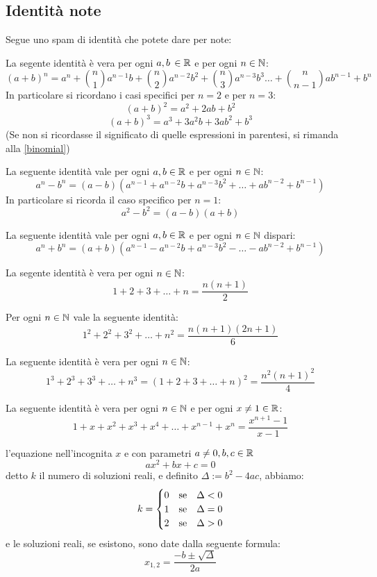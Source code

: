 \documentclass[11pt]{scrartcl}
\begin{document}
	
	\subsection{Identità note}
	Segue uno spam di identità che potete dare per note:
	
	\begin{theorem}
		\label{ident:newton}
		La segente identità è vera per ogni $a,b\,\in\mathbb R$ e per ogni $n\in\mathbb N$:
		$$(a+b)^n=a^n+\binom{n}{1}a^{n-1}b+\binom{n}{2}a^{n-2}b^2+\binom{n}{3}a^{n-3}b^3\dots+\binom{n}{n-1}ab^{n-1}+b^n$$
		In particolare si ricordano i casi specifici per $n=2$ e per $n=3$:
		$$(a+b)^2=a^2+2ab+b^2$$
		$$(a+b)^3=a^3+3a^2b+3ab^2+b^3$$
		(Se non si ricordasse il significato di quelle espressioni in parentesi, si rimanda alla \cref{binomial})
	\end{theorem}
	\begin{theorem}
		La seguente identità vale per ogni $a,b \in \mathbb R$ e per ogni $n \in \mathbb N$:
		$$a^n-b^n=(a-b)(a^{n-1}+a^{n-2}b+a^{n-3}b^2+\dots+ab^{n-2}+b^{n-1})$$
		In particolare si ricorda il caso specifico per $n=1$:
		$$a^2-b^2=(a-b)(a+b)$$
	\end{theorem}
	\begin{theorem}
		La seguente identità vale per ogni $a,b \in \mathbb R$ e per ogni $n \in \mathbb N$ dispari:
		$$a^n+b^n=(a+b)(a^{n-1}-a^{n-2}b+a^{n-3}b^2-\dots-ab^{n-2}+b^{n-1})$$
	\end{theorem}
	\begin{theorem}[Gauss]
		\label{sum:1}
		La segente identità è vera per ogni $n \in \mathbb N$:
		$$1+2+3+\dots+n=\frac{n(n+1)}{2}$$
	\end{theorem}
	\begin{theorem}
		\label{sum:2}
		Per ogni $n\in\mathbb N$ vale la seguente identità:
		$$1^2+2^2+3^2+\dots+n^2=\frac{n(n+1)(2n+1)}{6}$$
	\end{theorem}
	\begin{theorem}[Nicomaco]
		\label{sum:3}
		La seguente identità è vera per ogni $n \in \mathbb N$:
		$$1^3+2^3+3^3+\dots+n^3=(1+2+3+\dots+n)^2=\frac{n^2(n+1)^2}{4}$$
	\end{theorem}
	\begin{theorem}
		\label{sum:g}
		La seguente identità è vera per ogni $n \in \mathbb N$ e per ogni $x\ne 1 \in \mathbb R$:
		$$1+x+x^2+x^3+x^4+\dots+x^{n-1}+x^n=\frac{x^{n+1}-1}{x-1}$$
	\end{theorem}
	\begin{theorem}
		\label{quadFormula}
		l'equazione nell'incognita $x$ e con parametri $a\ne0,b,c \in \mathbb R$
		$$ax^2+bx+c=0$$
		detto $k$ il numero di soluzioni reali, e definito $\Delta:=b^2-4ac$, abbiamo:
		\begin{equation}\notag
			k=
			\begin{cases}
				0 & \text{se}\quad \Delta<0 \\
				1 & \text{se}\quad \Delta=0 \\
				2 & \text{se}\quad \Delta>0
			\end{cases}
		\end{equation}
		e le soluzioni reali, se esistono, sono date dalla seguente formula:
		$$x_{1,2}=\frac{-b\pm\sqrt{\Delta}}{2a}$$
	\end{theorem}
	
\end{document}
